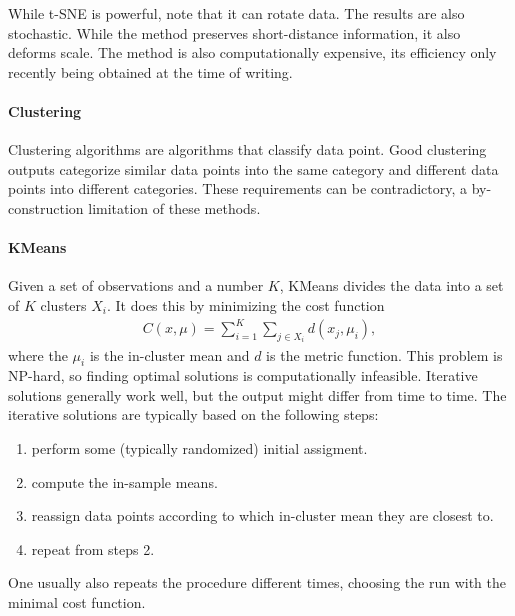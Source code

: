 While t-SNE is powerful, note that it can rotate data. The results are also stochastic. While the method preserves short-distance information, it also deforms scale. The method is also computationally expensive, its efficiency only recently being obtained at the time of writing.

\paragraph{Clustering}
Clustering algorithms are algorithms that classify data point. Good clustering outputs categorize similar data points into the same category and different data points into different categories. These requirements can be contradictory, a by-construction limitation of these methods.

\paragraph{KMeans}
Given a set of observations and a number $K$, KMeans divides the data into a set of $K$ clusters $X_{i}$. It does this by minimizing the cost function
\begin{align*}
	C(x, \mu) = \sum\limits_{i = 1}^{K}\sum\limits_{j\in X_{i}}d(x_{j}, \mu_{i}),
\end{align*}
where the $\mu_{i}$ is the in-cluster mean and $d$ is the metric function. This problem is NP-hard, so finding optimal solutions is computationally infeasible. Iterative solutions generally work well, but the output might differ from time to time. The iterative solutions are typically based on the following steps:
\begin{enumerate}
	\item perform some (typically randomized) initial assigment.
	\item compute the in-sample means.
	\item reassign data points according to which in-cluster mean they are closest to.
	\item repeat from steps 2.
\end{enumerate}
One usually also repeats the procedure different times, choosing the run with the minimal cost function. 

